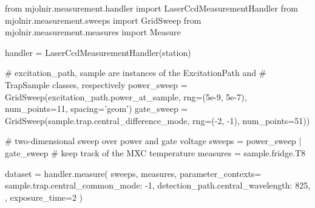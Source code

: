 \begin{listing}[htpb]
    \begin{pycode}
        from mjolnir.measurement.handler import LaserCcdMeasurementHandler
        from mjolnir.measurement.sweeps import GridSweep
        from mjolnir.measurement.measures import Measure

        handler = LaserCcdMeasurementHandler(station)

        # excitation_path, sample are instances of the ExcitationPath and
        # TrapSample classes, respectively
        power_sweep = GridSweep(excitation_path.power_at_sample,
                                rng=(5e-9, 5e-7), num_points=11,
                                spacing='geom')
        gate_sweep = GridSweep(sample.trap.central_difference_mode,
                               rng=(-2, -1), num_points=51))

        # two-dimensional sweep over power and gate voltage
        sweeps = power_sweep | gate_sweep
        # keep track of the MXC temperature
        measures = sample.fridge.T8

        dataset = handler.measure(
            sweeps,
            measures,
            parameter_contexts={
                sample.trap.central_common_mode: -1,
                detection_path.central_wavelength: 825,
            },
            exposure_time=2
        )
    \end{pycode}
    \caption[\mjolnir measurement workflow]{
        Setup and measurement workflow using the \mjolnir package.
         is a \qcodes {} object managing the instruments.
        The  object describes a nested loop on whose inner iteration the difference mode parameter of the trap's central gate is swept over a linear grid and on whose outer iteration the laser power, adjusted for the \acrlong{bs} ratio, is swept over a logarithmically spaced grid.
        No dependent parameters ( objects) need to be explicitly specified as the  measures the \gls{ccd} spectrum as well as laser power and leakage currents of the swept gates by default.
        The  argument is used to set the spectrometer wavelength to \qty{825}{\nano\meter} and the common mode voltage of the active trap to \qty{-1}{\volt}.
        The  argument is passed through to the  method, where it is used to set up the \gls{ccd} for acquisition.
    }
    \label{lst:exp:mjolnir:workflow}
\end{listing}

